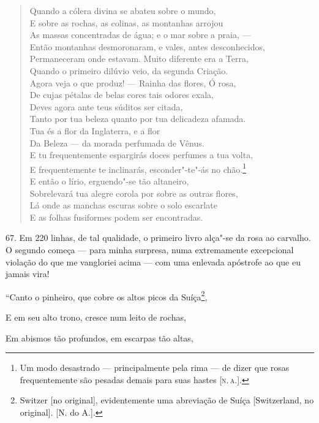 \begin{verse}
Quando a cólera divina se abateu sobre o mundo,\\
E sobre as rochas, as colinas, as montanhas arrojou\\
As massas concentradas de água; e o mar sobre a praia, ---\\
Então montanhas desmoronaram, e vales, antes desconhecidos,\\
Permaneceram onde estavam. Muito diferente era a Terra,\\
Quando o primeiro dilúvio veio, da segunda Criação.\\
Agora veja o que produz! --- Rainha das flores, Ó rosa,\\
De cujas pétalas de belas cores tais odores exala,\\
Deves agora ante teus súditos ser citada,\\
Tanto por tua beleza quanto por tua delicadeza afamada.\\
Tua és a flor da Inglaterra, e a flor\\
Da Beleza --- da morada perfumada de Vênus.\\
E tu frequentemente espargirás doces perfumes a tua volta,\\
E frequentemente te inclinarás, esconder"-te"-ás no chão.\footnote{Um modo
  desastrado --- principalmente pela rima --- de dizer que rosas
  frequentemente são pesadas demais para suas hastes {[}\textsc{n.\,a.}{]}.}\\
E então o lírio, erguendo"-se tão altaneiro,\\
Sobrelevará tua alegre corola por sobre as outras flores,\\
Lá onde as manchas escuras sobre o solo escarlate\\
E as folhas fusiformes podem ser encontradas.
\end{verse}

67. Em 220 linhas, de tal qualidade, o primeiro livro alça"-se da rosa ao
carvalho. O segundo começa --- para minha surpresa, numa extremamente
excepcional violação do que me vangloriei acima --- com uma enlevada
apóstrofe ao que eu jamais vira!

``Canto o pinheiro, que cobre os altos picos da Suíça\footnote{Switzer
  {[}no original{]}, evidentemente uma abreviação de Suíça
  {[}Switzerland, no original{]}. {[}N. do A.{]}.},

E em seu alto trono, cresce num leito de rochas,

Em abismos tão profundos, em escarpas tão altas,

